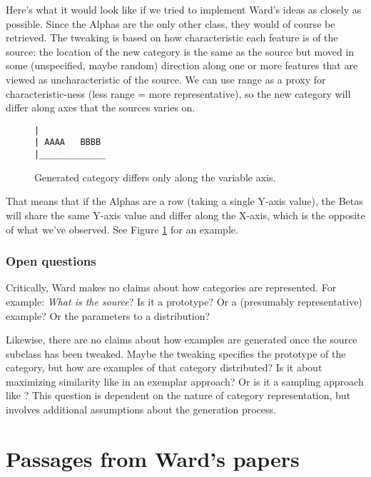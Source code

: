 \documentclass[12pt]{article}
\begin{document}
Here's what it would look like if we tried to implement Ward's ideas as closely as possible. Since the Alphas are the only other class, they would of course be retrieved. The tweaking is based on how characteristic each feature is of the source: the location of the new category is the same as the source but moved in some (unspecified, maybe random) direction along one or more features that are viewed as uncharacteristic of the source. We can use range as a proxy for characteristic-ness (less range = more representative), so the new category will differ along axes that the sources varies on. 

\begin{figure}[ht]
    \begin{center}
    \begin{BVerbatim}
|
| AAAA   BBBB
|_____________
    \end{BVerbatim}
    \caption{Generated category differs only along the variable axis.}
    \label{fig:AB-Sample}
    \end{center}
\end{figure}

That means that if the Alphas are a row (taking a single Y-axis value), the Betas will share the same Y-axis value and differ along the X-axis, which is the opposite of what we've observed. See Figure \ref{fig:AB-Sample} for an example. 

\subsubsection{Open questions}

Critically, Ward makes no claims about how categories are represented. For example: \textit{What is the source}? Is it a prototype? Or a (presumably representative) example? Or the parameters to a distribution? 

Likewise, there are no claims about how examples are generated once the source subclass has been tweaked. Maybe the tweaking specifies the prototype of the category, but how are examples of that category distributed? Is it about maximizing similarity like in an exemplar approach? Or is it a sampling approach like \cite{jern2013probabilistic}? This question is dependent on the nature of category representation, but involves additional assumptions about the generation process. 

\clearpage




\clearpage
\appendix
\section{Passages from Ward's papers}
\label{ap:passages}
\end{document}
